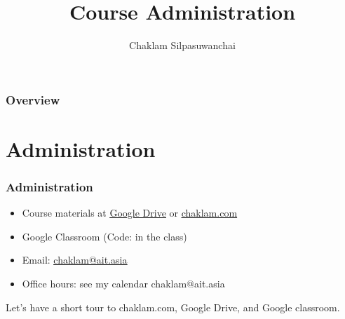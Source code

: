 \documentclass{beamer}
\title[Course Administration]{Course Administration} %
\author{Chaklam Silpasuwanchai} %
\institute[AIT] %
{
Asian Institute of Technology \\ %
\medskip
\textit{chaklam@ait.asia} %
}
\date{} %
\begin{document}
\begin{frame}
\titlepage %
\end{frame}

\begin{frame}
\frametitle{Overview} %
\tableofcontents %
\end{frame}



\section{Administration} %

\begin{frame}
\frametitle{Administration}
\begin{itemize}
	\item Course materials at \underline{\href{https://drive.google.com/drive/folders/1cHWrCKnRc1_xkWr_IgW4X-iBqm1hsnhP?usp=sharing}{Google Drive}} or \underline{\url{chaklam.com}}
	\item Google Classroom (Code: in the class)
	\item Email: \underline{\href{mailto:chaklam@ait.asia}{chaklam@ait.asia}} 
	\item Office hours: see my calendar chaklam@ait.asia
\end{itemize}
\vspace{0.2cm}
Let's have a short tour to chaklam.com,  Google Drive,  and Google classroom.
\end{frame}
\end{document}
